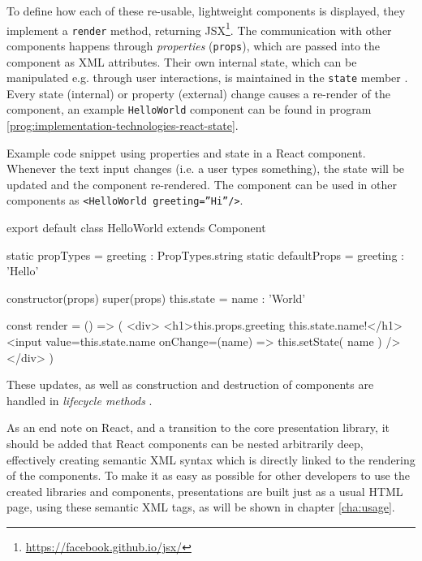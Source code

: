 To define how each of these re-usable, lightweight components is displayed, they implement a \texttt{render} method, returning JSX\footnote{\url{https://facebook.github.io/jsx/}}. The communication with other components happens through \emph{properties} (\texttt{props}), which are passed into the component as XML attributes. Their own internal state, which can be manipulated e.g. through user interactions, is maintained in the \texttt{state} member \cite{react-docu}. Every state (internal) or property (external) change causes a re-render of the component, an example \texttt{HelloWorld} component can be found in program \ref{prog:implementation-technologies-react-state}.
%
\begin{program}
\caption{Example code snippet using properties and state in a React component. Whenever the text input changes (i.e. a user types something), the state will be updated and the component re-rendered. The component can be used in other components as \texttt{<HelloWorld greeting=''Hi''/>}.}
\label{prog:implementation-technologies-react-state}
\begin{JsCode}
export default class HelloWorld extends Component {
  static propTypes = { greeting : PropTypes.string }
  static defaultProps = { greeting : 'Hello' }

  constructor(props) {
    super(props)
    this.state = { name : 'World' }
  }

  const render = () => (
    <div>
      <h1>{this.props.greeting} {this.state.name}!</h1>
      <input value={this.state.name} onChange={(name) => this.setState({ name })} />
    </div>  
  )
}
\end{JsCode}
\end{program}
%
These updates, as well as construction and destruction of components are handled in \emph{lifecycle methods} \cite{react-docu}.

As an end note on React, and a transition to the core presentation library, it should be added that React components can be nested arbitrarily deep, effectively creating semantic XML syntax which is directly linked to the rendering of the components. To make it as easy as possible for other developers to use the created libraries and components, presentations are built just as a usual HTML page, using these semantic XML tags, as will be shown in chapter \ref{cha:usage}.

